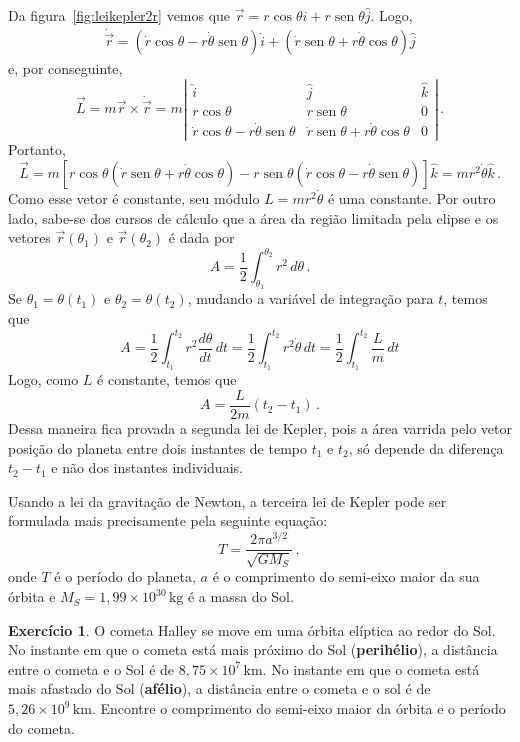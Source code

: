 \documentclass[12pt,a4paper]{article}
\theoremstyle{definition}
\newtheorem{ex}{Exercício}[section]
\DeclareMathOperator{\sen}{sen}
\begin{document}
Da figura~\ref{fig:leikepler2r} vemos que
$\vec r=r\cos\theta\hat i+r\sen\theta\hat j$. Logo,
\begin{equation*}
  \begin{split}
    \dot{\vec r}=(\dot r\cos\theta-r\dot\theta\sen\theta)\hat i+(\dot
    r\sen\theta+r\dot\theta\cos\theta)\hat j
  \end{split}
\end{equation*}
e, por conseguinte,
$$\vec L=m\vec r\times\dot{\vec r}=m\left|
  \begin{array}{ccc}
    \hat i&\hat j&\hat k\\
    r\cos\theta& r\sen\theta& 0\\
    \dot r\cos\theta-r\dot\theta\sen\theta& \dot r\sen\theta+r\dot\theta\cos\theta&0
  \end{array}
  \right|\,.$$
Portanto,
$$\vec L=m[r\cos\theta(\dot r\sen\theta+r\dot\theta\cos\theta)-r\sen\theta(\dot r\cos\theta-r\dot\theta\sen\theta)]\hat k=mr^2\dot\theta\hat k\,.$$
Como esse vetor é constante, seu módulo $L=mr^2\dot\theta$ é uma
constante. Por outro lado, sabe-se dos cursos de cálculo que a área da
região limitada pela elipse e os vetores $\vec r(\theta_1)$ e
$\vec r(\theta_2)$ é dada por
$$A=\frac{1}{2}\int_{\theta_1}^{\theta_2}r^2\,d\theta\,.$$
Se $\theta_1=\theta(t_1)$ e $\theta_2=\theta(t_2)$, mudando a variável
de integração para $t$, temos que
$$A=\frac{1}{2}\int_{t_1}^{t_2}r^2\frac{d\theta}{dt}\,dt=\frac{1}{2}\int_{t_1}^{t_2}r^2\dot\theta\,dt=\frac{1}{2}\int_{t_1}^{t_2}\frac{L}{m}\,dt$$
Logo, como $L$ é constante, temos que
$$A=\frac{L}{2m}(t_2-t_1)\,.$$
Dessa maneira fica provada a segunda lei de Kepler, pois a área
varrida pelo vetor posição do planeta entre dois instantes de tempo
$t_1$ e $t_2$, só depende da diferença $t_2-t_1$ e não dos instantes
individuais.

Usando a lei da gravitação de Newton, a terceira lei de Kepler pode
ser formulada mais precisamente pela seguinte equação:
$$T=\frac{2\pi a^{3/2}}{\sqrt{GM_S}}\,,$$
onde $T$ é o período do planeta, $a$ é o comprimento do semi-eixo
maior da sua órbita e $M_S=1{,}99\times 10^{30}\,\mathrm{kg}$ é a
massa do Sol.

\begin{ex}
  O cometa Halley se move em uma órbita elíptica ao redor do Sol. No
  instante em que o cometa está mais próximo do Sol
  (\textbf{perihélio}), a distância entre o cometa e o Sol é de
  $8{,}75\times 10^7\,\mathrm{km}$. No instante em que o cometa está
  mais afastado do Sol (\textbf{afélio}), a distância entre o cometa e
  o sol é de $5{,}26\times 10^9\,\mathrm{km}$. Encontre o comprimento
  do semi-eixo maior da órbita e o período do cometa.
\end{ex}
\end{document}
